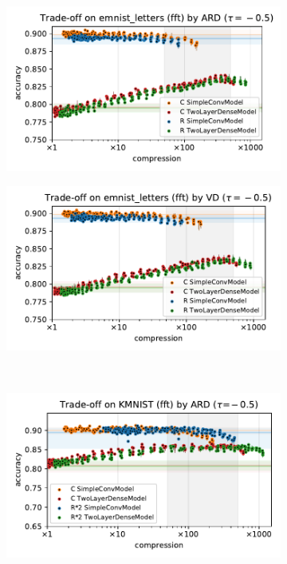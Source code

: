 \documentclass[a4paper,10pt,onecolumn]{article}
\begin{document}
\begin{figure}[b]
\begin{subfigure}[b]{0.5\columnwidth}
    \centering
    \includegraphics[width=\columnwidth]{figure__mnist-like__trade-off/appendix__ARD__emnist_letters__fft__-0.5.pdf}
  \end{subfigure}%
  \begin{subfigure}[b]{0.5\columnwidth}
    \centering
    \includegraphics[width=\columnwidth]{figure__mnist-like__trade-off/appendix__VD__emnist_letters__fft__-0.5.pdf}
  \end{subfigure} \\%
  \begin{subfigure}[b]{0.5\columnwidth}
    \centering
    \includegraphics[width=\columnwidth]{figure__mnist-like__trade-off/appendix__cmp__ARD__kmnist__fft__-0.5.pdf}

\end{subfigure}
\end{figure}
\end{document}
